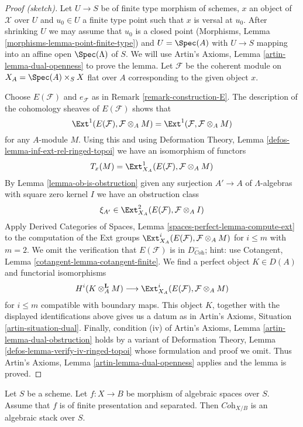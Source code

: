 \begin{proof}[Proof (sketch)]
Let $U \to S$ be of finite type morphism of schemes, $x$ an object of
$\mathcal{X}$ over $U$ and $u_0 \in U$ a finite type point such that
$x$ is versal at $u_0$. After shrinking $U$ we may assume that $u_0$
is a closed point (Morphisms, Lemma \ref{morphisms-lemma-point-finite-type})
and $U = \Spec(A)$ with $U \to S$ mapping into an
affine open $\Spec(\Lambda)$ of $S$. We will use
Artin's Axioms, Lemma \ref{artin-lemma-dual-openness} to prove the lemma.
Let $\mathcal{F}$ be the coherent module on $X_A = \Spec(A) \times_S X$
flat over $A$ corresponding to the given object $x$.

\medskip\noindent
Choose $E(\mathcal{F})$ and $e_\mathcal{F}$ as in
Remark \ref{remark-construction-E}.
The description of the cohomology sheaves of $E(\mathcal{F})$ shows
that
$$
\Ext^1(E(\mathcal{F}), \mathcal{F} \otimes_A M) =
\Ext^1(\mathcal{F}, \mathcal{F} \otimes_A M)
$$
for any $A$-module $M$. Using this and using
Deformation Theory, Lemma \ref{defos-lemma-inf-ext-rel-ringed-topoi}
we have an isomorphism of functors
$$
T_x(M) = \Ext^1_{X_A}(E(\mathcal{F}), \mathcal{F} \otimes_A M)
$$
By Lemma \ref{lemma-ob-is-obstruction} given any surjection $A' \to A$
of $\Lambda$-algebras with square zero kernel $I$ we have an obstruction class
$$
\xi_{A'} \in \Ext^2_{X_A}(E(\mathcal{F}), \mathcal{F} \otimes_A I)
$$
Apply Derived Categories of Spaces, Lemma
\ref{spaces-perfect-lemma-compute-ext}
to the computation of the Ext groups
$\Ext^i_{X_A}(E(\mathcal{F}), \mathcal{F} \otimes_A M)$
for $i \leq m$ with $m = 2$. We omit the verification that
$E(\mathcal{F})$ is in $D^-_{\textit{Coh}}$; hint: use
Cotangent, Lemma \ref{cotangent-lemma-cotangent-finite}.
We find a perfect object $K \in D(A)$
and functorial isomorphisms
$$
H^i(K \otimes_A^\mathbf{L} M)
\longrightarrow
\Ext^i_{X_A}(E(\mathcal{F}), \mathcal{F} \otimes_A M)
$$
for $i \leq m$ compatible with boundary maps. This object $K$, together
with the displayed identifications above gives us a datum as in
Artin's Axioms, Situation \ref{artin-situation-dual}.
Finally, condition (iv) of
Artin's Axioms, Lemma \ref{artin-lemma-dual-obstruction}
holds by a variant of
Deformation Theory, Lemma \ref{defos-lemma-verify-iv-ringed-topoi}
whose formulation and proof we omit.
Thus Artin's Axioms, Lemma \ref{artin-lemma-dual-openness}
applies and the lemma is proved.
\end{proof}

\begin{theorem}
\label{theorem-coherent-algebraic-general}
Let $S$ be a scheme. Let $f : X \to B$ be morphism of algebraic spaces
over $S$. Assume that $f$ is of finite presentation and separated. Then
$\textit{Coh}_{X/B}$ is an algebraic stack over $S$.
\end{theorem}

